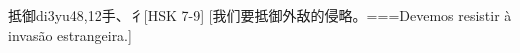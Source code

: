 \begin{EntryWithPhonetic}{抵御}{di3yu4}{8,12}{⼿、⼻}[HSK 7-9]
  [我们要抵御外敌的侵略。===Devemos resistir à invasão estrangeira.]
\end{EntryWithPhonetic}
